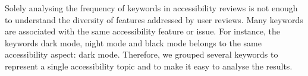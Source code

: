 
Solely analysing the frequency of keywords in accessibility reviews is not enough to understand the diversity of features addressed by user reviews. 
Many keywords are associated with the same accessibility feature or issue. 
For instance, the keywords dark mode, night mode and black mode belongs to the same accessibility aspect: dark mode. 
Therefore, we grouped several keywords to represent a single accessibility topic and to make it easy to analyse the results.


